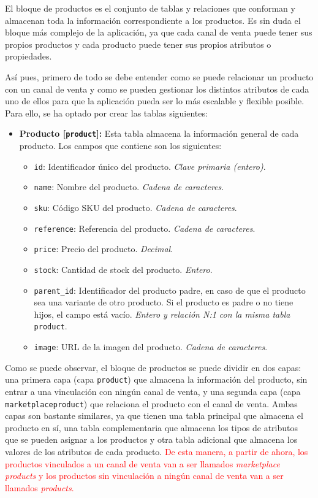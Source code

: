 El bloque de productos es el conjunto de tablas y relaciones que conforman y almacenan toda la información correspondiente a los productos. Es sin duda el bloque más complejo de la aplicación, ya que cada canal de venta puede tener sus propios productos y cada producto puede tener sus propios atributos o propiedades.

Así pues, primero de todo se debe entender como se puede relacionar un producto con un canal de venta y como se pueden gestionar los distintos atributos de cada uno de ellos para que la aplicación pueda ser lo más escalable y flexible posible. Para ello, se ha optado por crear las tablas siguientes:

\begin{itemize}
    \item \textbf{Producto [\texttt{product}]:} Esta tabla almacena la información general de cada producto. Los campos que contiene son los siguientes:
          \begin{itemize}
              \item \texttt{id}: Identificador único del producto. \textit{Clave primaria (entero)}.
              \item \texttt{name}: Nombre del producto. \textit{Cadena de caracteres}.
              \item \texttt{sku}: Código SKU del producto. \textit{Cadena de caracteres}.
              \item \texttt{reference}: Referencia del producto. \textit{Cadena de caracteres}.
              \item \texttt{price}: Precio del producto. \textit{Decimal}.
              \item \texttt{stock}: Cantidad de stock del producto. \textit{Entero}.
              \item \texttt{parent\_id}: Identificador del producto padre, en caso de que el producto sea una variante de otro producto. Si el producto es padre o no tiene hijos, el campo está vacío. \textit{Entero y relación N:1 con la misma tabla} \texttt{product}.
              \item \texttt{image}: URL de la imagen del producto. \textit{Cadena de caracteres}.
          \end{itemize}
\end{itemize}

Como se puede observar, el bloque de productos se puede dividir en dos capas: una primera capa (capa  \texttt{product}) que almacena la información del producto, sin entrar a una vinculación con ningún canal de venta, y una segunda capa (capa  \texttt{marketplaceproduct}) que relaciona el producto con el canal de venta. Ambas capas son bastante similares, ya que tienen una tabla principal que almacena el producto en sí, una tabla complementaria que almacena los tipos de atributos que se pueden asignar a los productos y otra tabla adicional que almacena los valores de los atributos de cada producto. \textcolor{red}{De esta manera, a partir de ahora, los productos vinculados a un canal de venta van a ser llamados \textit{marketplace products} y los productos sin vinculación a ningún canal de venta van a ser llamados \textit{products}.}

